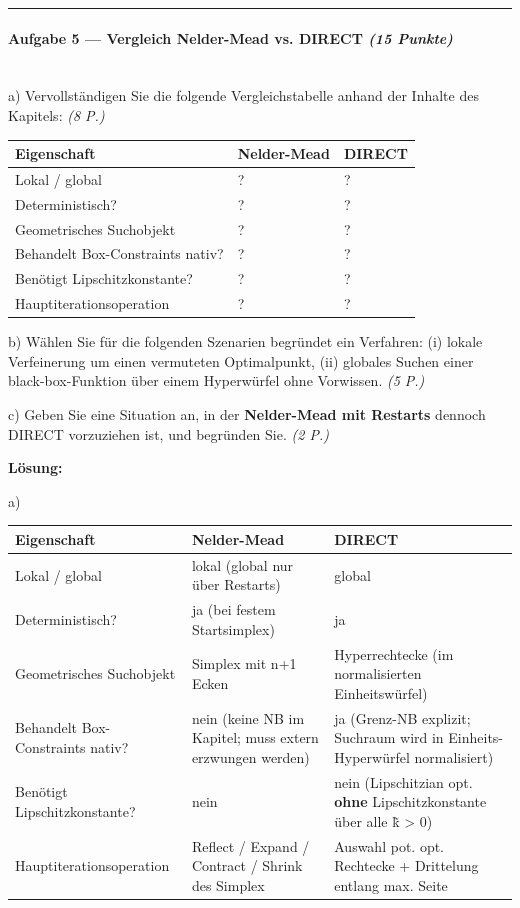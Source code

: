 \documentclass[11pt, a4paper]{article}
\begin{document}
\noindent\textcolor{rulegray}{\rule{\linewidth}{0.4pt}}


\paragraph{Aufgabe 5 — Vergleich Nelder-Mead vs. DIRECT \textit{(15 Punkte)}}\mbox{}\\[2pt]

a) Vervollständigen Sie die folgende Vergleichstabelle anhand der Inhalte des Kapitels: \textit{(8 P.)}



{\small
\begin{tabularx}{\linewidth}{XXX}
\hline
\rowcolor{tableheadbg}
{\color{white}\textbf{Eigenschaft}} & {\color{white}\textbf{Nelder-Mead}} & {\color{white}\textbf{DIRECT}} \\[2pt]
\hline
\endhead
\hline
\endfoot
Lokal / global & ? & ? \\
Deterministisch? & ? & ? \\
Geometrisches Suchobjekt & ? & ? \\
Behandelt Box-Constraints nativ? & ? & ? \\
Benötigt Lipschitzkonstante? & ? & ? \\
Hauptiterationsoperation & ? & ? \\
\end{tabularx}
}


b) Wählen Sie für die folgenden Szenarien begründet ein Verfahren: (i) lokale Verfeinerung um einen vermuteten Optimalpunkt, (ii) globales Suchen einer black-box-Funktion über einem Hyperwürfel ohne Vorwissen. \textit{(5 P.)}


c) Geben Sie eine Situation an, in der \textbf{Nelder-Mead mit Restarts} dennoch DIRECT vorzuziehen ist, und begründen Sie. \textit{(2 P.)}


\textbf{Lösung:}


a)



{\small
\begin{tabularx}{\linewidth}{XXX}
\hline
\rowcolor{tableheadbg}
{\color{white}\textbf{Eigenschaft}} & {\color{white}\textbf{Nelder-Mead}} & {\color{white}\textbf{DIRECT}} \\[2pt]
\hline
\endhead
\hline
\endfoot
Lokal / global & lokal (global nur über Restarts) & global \\
Deterministisch? & ja (bei festem Startsimplex) & ja \\
Geometrisches Suchobjekt & Simplex mit n+1 Ecken & Hyperrechtecke (im normalisierten Einheitswürfel) \\
Behandelt Box-Constraints nativ? & nein (keine NB im Kapitel; muss extern erzwungen werden) & ja (Grenz-NB explizit; Suchraum wird in Einheits-Hyperwürfel normalisiert) \\
Benötigt Lipschitzkonstante? & nein & nein (Lipschitzian opt. \textbf{ohne} Lipschitzkonstante über alle k̃ > 0) \\
Hauptiterationsoperation & Reflect / Expand / Contract / Shrink des Simplex & Auswahl pot. opt. Rechtecke + Drittelung entlang max. Seite \\
\end{tabularx}
}
\end{document}
